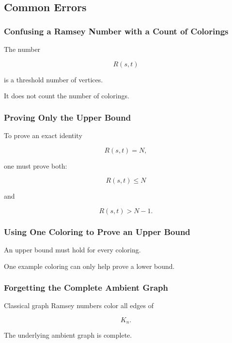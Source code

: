 \subsection{Common Errors}
\label{subsec:ramsey-common-errors}

\subsubsection{Confusing a Ramsey Number with a Count of Colorings}

The number

\[
R(s,t)
\]

is a threshold number of vertices.

It does not count the number of colorings.

\subsubsection{Proving Only the Upper Bound}

To prove an exact identity

\[
R(s,t)=N,
\]

one must prove both:

\[
R(s,t)\leq N
\]

and

\[
R(s,t)>N-1.
\]

\subsubsection{Using One Coloring to Prove an Upper Bound}

An upper bound must hold for every coloring.

One example coloring can only help prove a lower bound.

\subsubsection{Forgetting the Complete Ambient Graph}

Classical graph Ramsey numbers color all edges of

\[
K_n.
\]

The underlying ambient graph is complete.


